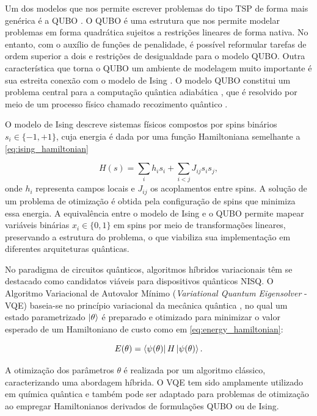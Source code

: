 Um dos modelos que nos permite escrever problemas do tipo TSP de forma mais genérica é a QUBO \cite{lewis2017quadratic}. O QUBO é uma estrutura que nos permite modelar problemas em forma quadrática sujeitos a restrições lineares de forma nativa. No entanto, com o auxílio de funções de penalidade, é possível reformular tarefas de ordem superior a dois e restrições de desigualdade para o modelo QUBO. Outra característica que torna o QUBO um ambiente de modelagem muito importante é sua estreita conexão com o modelo de Ising \cite{cipra1987introduction}. O modelo QUBO constitui um problema central para a computação quântica adiabática \cite{mcgeoch2013experimental}, que é resolvido por meio de um processo físico chamado recozimento quântico \cite{mcgeoch2022adiabatic, brooke1999quantum}.

O modelo de Ising descreve sistemas físicos compostos por spins binários $s_i \in \{-1, +1\}$, cuja energia é dada por uma função Hamiltoniana semelhante a \autoref{eq:ising_hamiltonian}

\begin{equation}
    \label{eq:ising_hamiltonian}
    H(s) = \sum_i h_i s_i + \sum_{i<j} J_{ij} s_i s_j,
\end{equation}
onde $h_i$ representa campos locais e $J_{ij}$ os acoplamentos entre spins. A solução de um problema de otimização é obtida pela configuração de spins que minimiza essa energia. A equivalência entre o modelo de Ising e o QUBO permite mapear variáveis binárias $x_i \in \{0,1\}$ em spins por meio de transformações lineares, preservando a estrutura do problema, o que viabiliza sua implementação em diferentes arquiteturas quânticas.

No paradigma de circuitos quânticos, algoritmos híbridos variacionais têm se destacado como candidatos viáveis para dispositivos quânticos NISQ. O Algoritmo Variacional de Autovalor Mínimo (\textit{Variational Quantum Eigensolver} - VQE) baseia-se no princípio variacional da mecânica quântica \cite{cerezo2021variational,peruzzo2014variational}, no qual um estado parametrizado $\ket{\theta}$ é preparado e otimizado para minimizar o valor esperado de um Hamiltoniano de custo como em \autoref{eq:energy_hamiltonian}:

\begin{equation}
    \label{eq:energy_hamiltonian}
    E(\theta) = \bra{\psi(\theta)} H \ket{\psi(\theta)}.
\end{equation}

A otimização dos parâmetros $\theta$ é realizada por um algoritmo clássico, caracterizando uma abordagem híbrida. O VQE tem sido amplamente utilizado em química quântica \cite{cao2019quantum} e também pode ser adaptado para problemas de otimização \cite{moll2018quantum} ao empregar Hamiltonianos derivados de formulações QUBO ou de Ising.

